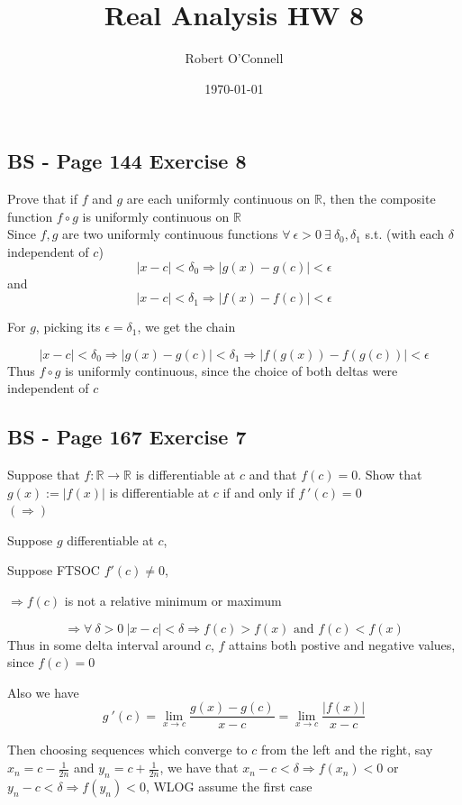 \documentclass{article}
\title{\textbf{Real Analysis HW 8}}
\author{Robert O'Connell}
\date{\today}
\begin{document}
\maketitle
\vspace{5mm}
\subsection*{BS - Page 144 Exercise 8}
Prove that if \(f\) and \(g\) are each uniformly continuous on \(\mathbb{R}\), then the composite function
\(f \circ g\) is uniformly continuous on \(\mathbb{R}\)
\\

Since \(f,g\) are two uniformly continuous functions
\(\forall \ \epsilon >0 \ \exists \ \delta_0, \delta_1\) s.t. (with each \(\delta\) independent of \(c\))
\[
|x-c| < \delta_0 \Rightarrow |g(x) - g(c)| < \epsilon 
\]
and
\[
|x-c| < \delta_1 \Rightarrow |f(x) - f(c)| < \epsilon 
\]

For \(g\), picking its \(\epsilon = \delta_1\), we get the chain

\[
|x-c| < \delta_0 \Rightarrow |g(x) - g(c)| < \delta_1 \Rightarrow |f(g(x)) - f(g(c))| < \epsilon 
\]
Thus \(f \circ g\) is uniformly continuous, since the choice of both deltas were independent of \(c\)

\subsection*{BS - Page 167 Exercise 7}
Suppose that \(f:\mathbb{R} \rightarrow \mathbb{R}\) is differentiable at \(c\) and that \(f(c) = 0\). Show
that \(g(x) := |f(x)|\) is differentiable at \(c\) if and only if \(f \ '(c) = 0\)
\\

\((\Rightarrow)\)

Suppose \(g\) differentiable at \(c\),

Suppose FTSOC \(f'(c) \neq 0\), 

\(\Rightarrow f(c)\) is not a relative minimum or maximum

\[
\Rightarrow \forall \ \delta > 0  \ |x-c|< \delta \Rightarrow f(c) > f(x) \text{ and } f(c) < f(x)
\]
Thus in some delta interval around \(c\), \(f\) attains both postive and negative values, since \(f(c) = 0\)

Also we have
\[
g \ ' (c) = \lim_{x\to c}{\frac{g(x) - g(c)}{x-c}} = \lim_{x\to c}{\frac{|f(x)|}{x-c}}
\]

Then choosing sequences which converge to \(c\) from the left and the right, say \(x_n = c - \frac{1}{2n}\) and \(y_n = c + \frac{1}{2n}\), 
we have that \(x_n - c < \delta \Rightarrow f(x_n) < 0\) or \(y_n - c < \delta \Rightarrow f(y_n) < 0\), WLOG assume the first case
\end{document}
